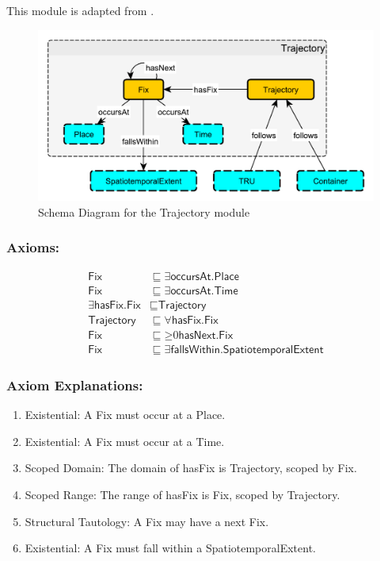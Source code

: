 This module is adapted from \cite{MODL}.

\begin{figure}[tb]
\begin{center}
\includegraphics[width=.7\textwidth]{diagrams/trajectory}
\end{center}
\caption{Schema Diagram for the Trajectory module}
\label{fig:trajectory}
\end{figure}

\subsubsection*{Axioms:}
\begin{align}
    \textsf{Fix} &\sqsubseteq \exists\textsf{occursAt.Place}\\
    \textsf{Fix} &\sqsubseteq \exists\textsf{occursAt.Time}\\
    \exists\textsf{hasFix.Fix} &\sqsubseteq \textsf{Trajectory}\\
    \textsf{Trajectory} &\sqsubseteq \forall\textsf{hasFix.Fix}\\
    \textsf{Fix} &\sqsubseteq \mathord{\geq} 0\textsf{hasNext.Fix}\\
    \textsf{Fix} &\sqsubseteq \exists\textsf{fallsWithin.SpatiotemporalExtent}
\end{align}


\subsubsection*{Axiom Explanations:}
\begin{enumerate}
    \item Existential: A \textsf{Fix} must occur at a \textsf{Place}.
    \item Existential: A \textsf{Fix} must occur at a \textsf{Time}.
    \item Scoped Domain: The domain of \textsf{hasFix} is \textsf{Trajectory}, scoped by \textsf{Fix}.
    \item Scoped Range: The range of \textsf{hasFix} is \textsf{Fix}, scoped by \textsf{Trajectory}.
    \item Structural Tautology: A \textsf{Fix} may have a next \textsf{Fix}.
    \item Existential: A \textsf{Fix} must fall within a \textsf{SpatiotemporalExtent}.
\end{enumerate}

